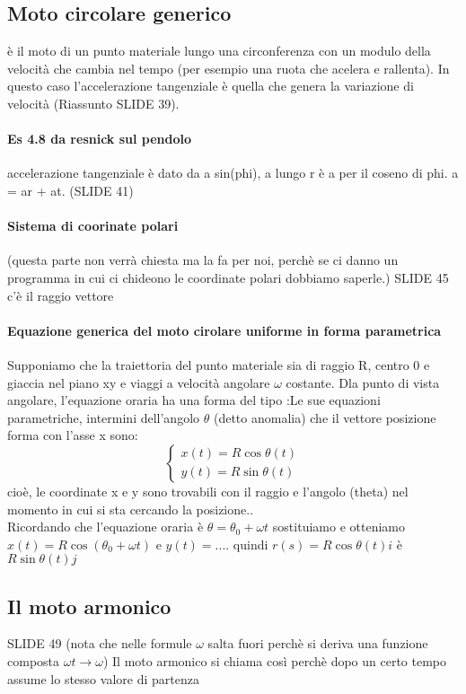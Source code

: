 \documentclass[12pt, a4paper, openany]{book}
\begin{document}
\subsection*{Moto circolare generico} è il moto di un punto materiale lungo una circonferenza con un modulo della velocità che cambia nel tempo (per esempio una ruota che acelera e rallenta).
In questo caso l'accelerazione tangenziale è quella che genera la variazione di velocità (Riassunto SLIDE 39).

\paragraph*{Es 4.8 da resnick sul pendolo}
accelerazione tangenziale è dato da a sin(phi), a lungo r è a per il coseno di phi. a = ar + at. (SLIDE 41)

\paragraph*{Sistema di coorinate polari} (questa parte non verrà chiesta ma la fa per noi, perchè se ci danno un programma in cui ci chideono le coordinate polari dobbiamo saperle.)
SLIDE 45 c'è il raggio vettore

\paragraph*{Equazione generica del moto cirolare uniforme in forma parametrica} Supponiamo che la traiettoria del punto materiale sia di raggio R, centro 0 e giaccia nel piano xy e viaggi a velocità angolare $\omega$ costante.
Dla punto di vista angolare, l'equazione oraria ha una forma del tipo :Le sue equazioni parametriche, intermini dell'angolo $\theta$ (detto anomalia) che il vettore posizione forma con l'asse x sono:
$$\begin{cases}
    x(t) = R \cos \theta(t)\\
    y(t) = R \sin \theta (t)
\end{cases}
$$
cioè, le coordinate x e y sono trovabili con il raggio e l'angolo (theta) nel momento in cui si sta cercando la posizione..
\\Ricordando che l'equazione oraria è $\theta = \theta_0 + \omega t$ sostituiamo e otteniamo $x(t) = R \cos (\theta_0 + \omega t)$ e $y(t)=...$.
quindi $r(s) = R\cos\theta(t) i$ è $R\sin\theta(t) j$

\subsection*{Il moto armonico}
SLIDE 49 (nota che nelle formule $\omega$ salta fuori perchè si deriva una funzione composta $\omega t \to \omega$)
Il moto armonico si chiama così perchè dopo un certo tempo assume lo stesso valore di partenza
\end{document}

